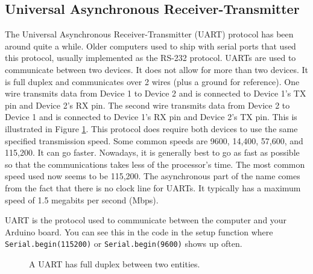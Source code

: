 \subsection{Universal Asynchronous Receiver-Transmitter}
The Universal Asynchronous Receiver-Transmitter (UART) protocol has been around quite a while. Older computers used to ship with
serial ports that used this protocol, usually implemented as the RS-232 protocol. UARTs are used to communicate between two devices.
It does not allow for more than two devices. It is full duplex and communicates over 2 wires (plus a ground for reference). 
One wire transmits data from Device 1 to Device 2 and is connected to Device 1's TX pin and Device 2's RX pin. The second wire 
transmits data from Device 2 to Device 1 and is connected to Device 1's RX pin and Device 2's TX pin. This is illustrated in 
Figure \ref{fig:uart}. This protocol does require both devices to use the same specified transmission speed. Some common speeds
are 9600, 14,400, 57,600, and 115,200. It can go faster. Nowadays, it is generally best to go as fast as possible so that
the communications takes less of the processor's time. The most common speed used now seems to be 115,200. The asynchronous 
part of the name comes from the fact that there is no clock line for UARTs. It typically has a maximum speed of 1.5 megabits 
per second (Mbps).

UART is the protocol used to communicate between the computer and your Arduino board. You can see this in the code 
in the setup function where \lstinline{Serial.begin(115200)} or \lstinline{Serial.begin(9600)} shows up often.

\begin{figure}[!htb]
	\centering
	\caption{A UART has full duplex between two entities.}
	\label{fig:uart}
\end{figure}

